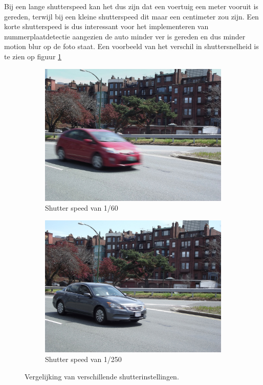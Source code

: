 Bij een lange shutterspeed kan het dus zijn dat een voertuig een meter vooruit is gereden, terwijl bij een kleine shutterspeed dit maar een centimeter zou zijn. Een korte shutterspeed is dus interessant voor het implementeren van nummerplaatdetectie aangezien de auto minder ver is gereden en dus minder motion blur op de foto staat. Een voorbeeld van het verschil in shuttersnelheid is te zien op figuur \ref{fig:ntlpc}
%
\begin{figure}[h!]
	\centering
	\begin{subfigure}[b]{0.4\linewidth}
		\includegraphics[width=\linewidth]{img/shutter-slow.jpg}
		\caption{Shutter speed van 1/60}
	\end{subfigure}
	\begin{subfigure}[b]{0.4\linewidth}
		\includegraphics[width=\linewidth]{img/shutter-fast.jpg}
		\caption{Shutter speed van 1/250}
	\end{subfigure}
	\caption{Vergelijking van verschillende shutterinstellingen. \autocite{easy2019shutter}}
	\label{fig:ntlpc}
\end{figure}

